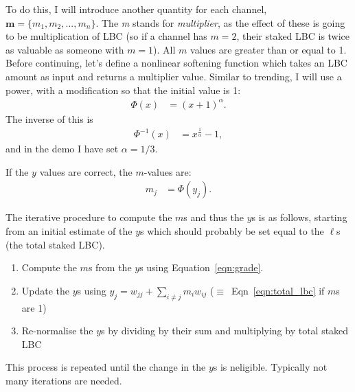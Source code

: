 \documentclass[a4paper, 12pt]{article}
\begin{document}
To do this, I will introduce another quantity for each channel,
$\boldsymbol{m} = \{m_1, m_2, ..., m_n\}$. The {\em m} stands for
{\em multiplier}, as the effect of these is going to be multiplication of LBC
(so if a channel has $m=2$, their staked LBC is twice as valuable as someone
with $m=1$). All $m$ values are greater than or equal to 1.
Before continuing, let's define a nonlinear softening function which takes
an LBC amount as input and returns a multiplier value. Similar to trending,
I will use a power, with a modification so that the initial value
is 1:
\begin{align}
\Phi(x) &= (x + 1)^\alpha.
\end{align}
The inverse of this is
\begin{align}
\Phi^{-1}(x) &= x^{\frac{1}{\alpha}} - 1,
\end{align}
and in the demo I have set $\alpha = 1/3$.

If the $y$ values are correct, the $m$-values are:
\begin{align}
m_j &= \Phi(y_j). \label{eqn:grade}
\end{align}

The iterative procedure to compute the $m$s and thus the $y$s is as follows,
starting from an initial estimate of the $y$s which should probably be set
equal to the $\ell$s (the total staked LBC).
\begin{enumerate}
\item Compute the $m$s from the $y$s using Equation~\ref{eqn:grade}.
\item Update the $y$s using $y_j = w_{jj} + \sum_{i \neq j} m_i w_{ij}$
($\equiv$~Eqn~\ref{eqn:total_lbc} if $m$s are 1)
\item Re-normalise the $y$s by dividing by their sum and multiplying by total
staked LBC
\end{enumerate}
This process is repeated until the change in the $y$s is neligible. Typically
not many iterations are needed.



\end{document}
